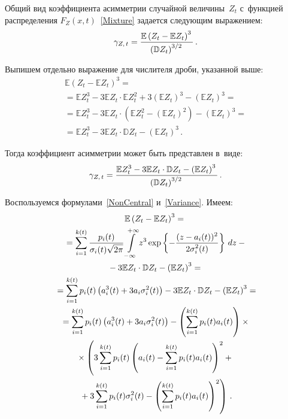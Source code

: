 \begin{multicols}{2}
Общий вид коэффициента асимметрии случайной величины~$Z_t$ с~функцией 
распределения $F_Z(x,t)$~\eqref{Mixture} задается следующим выражением:
\begin{equation*}
\gamma_{Z,\,t}=\displaystyle\frac{\displaystyle \mathbb{E} \left(Z_t-\mathbb{E} 
Z_t\right)^3\mathstrut}{\displaystyle \left(\mathbb{D} Z_t\right)^{3/2}\mathstrut}\,.
\end{equation*}

Выпишем отдельно выражение для числителя дроби, указанной выше:
\begin{multline*}
\mathbb{E} \left(Z_t-\mathbb{E} Z_t\right)^3={}\\
{}=
\mathbb{E} Z_t^3-3\mathbb{E} Z_t\cdot\mathbb{E} Z_t^2+3\left(
\mathbb{E} Z_t\right)^3-\left(\mathbb{E} Z_t\right)^3={}\\
{}=\mathbb{E} Z_t^3-3\mathbb{E} Z_t\cdot\left(\mathbb{E} Z_t^2-\left(
\mathbb{E} Z_t\right)^2\right)-\left(\mathbb{E} Z_t\right)^3={}\\
{}=\mathbb{E} Z_t^3-3\mathbb{E} Z_t\cdot\mathbb{D} Z_t-\left(\mathbb{E} Z_t\right)^3\,.
\end{multline*}

Тогда коэффициент асимметрии может быть представлен в~виде:
\begin{equation}
\gamma_{Z,\,t}=\displaystyle\frac{\displaystyle \mathbb{E} Z_t^3-3\mathbb{E} 
Z_t\cdot\mathbb{D} Z_t-\left(\mathbb{E} Z_t\right)^3\mathstrut}{\displaystyle \left(\mathbb{D} Z_t\right)^{3/2}\mathstrut}\,.
\label{Skew}
\end{equation}

Воспользуемся формулами~\eqref{NonCentral} и~\eqref{Variance}. Имеем:
\begin{multline*}
\mathbb{E} \left(Z_t-\mathbb{E} Z_t\right)^3={}\\
{}=
\sum\limits_{i=1}^{k(t)} \displaystyle\frac{\displaystyle p_i(t)\mathstrut}{\displaystyle \sigma_i(t)\sqrt{2\pi}\mathstrut} 
\int\limits_{-\infty}^{+\infty} z^3\exp\left\{-\displaystyle\frac{\displaystyle (z-a_i(t))^2\mathstrut}{\displaystyle 2\sigma_i^2(t)\mathstrut}\right\} \,dz-{}\\
{}-
3\mathbb{E} Z_t\cdot\mathbb{D} Z_t-\left(\mathbb{E} Z_t\right)^3={}\\
{}=\sum\limits_{i=1}^{k(t)} p_i(t)\left(a_i^3(t)+3a_i\sigma_i^2(t)\right)-3\mathbb{E} Z_t\cdot\mathbb{D} Z_t-\left(\mathbb{E} Z_t\right)^3=\\
{}=\sum\limits_{i=1}^{k(t)} p_i(t)\left(a_i^3(t)+3a_i\sigma_i^2(t)\right)-
\left(\sum\limits_{i=1}^{k(t)} p_i(t) a_i(t)\right)\times{}\\
{}\times\left(3\sum\limits_{i=1}^{k(t)} p_i(t) \left(a_i(t)-
\sum\limits_{i=1}^{k(t)} p_i(t) a_i(t)\right)^2+{}\right.\\
\left.{}+
3\sum\limits_{i=1}^{k(t)} p_i(t) \sigma_i^2(t)-\left(
\sum\limits_{i=1}^{k(t)} p_i(t) a_i(t)\right)^2\right)\,.
\end{multline*}


\end{multicols}
